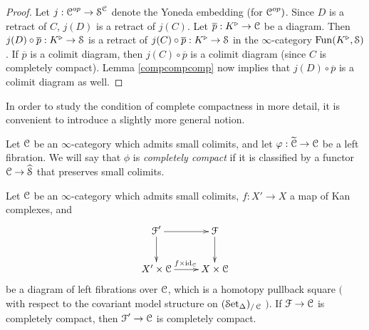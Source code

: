 \begin{proof}
Let $j: \operatorname{\mathcal{C}}^{op} \rightarrow \operatorname{\mathcal{S}}^{\operatorname{\mathcal{C}}}$ denote the Yoneda embedding (for $\operatorname{\mathcal{C}}^{op})$. Since $D$ is a retract of $C$, $j(D)$ is a retract of $j(C)$. Let $\overline{p}: K^{\triangleright} \rightarrow \operatorname{\mathcal{C}}$ be a diagram. Then $j(D) \circ \overline{p}: K^{\triangleright} \rightarrow \operatorname{\mathcal{S}}$
is a retract of $j(C) \circ \overline{p}: K^{\triangleright} \rightarrow \operatorname{\mathcal{S}}$ in the $\infty$-category
$\operatorname{Fun}(K^{\triangleright}, \operatorname{\mathcal{S}})$. If $\overline{p}$ is a colimit diagram, then $j(C) \circ \overline{p}$ is a colimit diagram (since $C$ is completely compact). Lemma \ref{compcompcomp} now implies
that $j(D) \circ \overline{p}$ is a colimit diagram as well.
\end{proof}

In order to study the condition of complete compactness in more detail, it is convenient to introduce a slightly more general notion.

\begin{definition}
Let $\operatorname{\mathcal{C}}$ be an $\infty$-category which admits small colimits, and let
$\varphi: \widetilde{\operatorname{\mathcal{C}}} \rightarrow \operatorname{\mathcal{C}}$ be a left fibration. We will say that $\phi$ is
{\it completely compact} if it is classified by a functor $\operatorname{\mathcal{C}} \rightarrow \widehat{\operatorname{\mathcal{S}}}$ that preserves small colimits.
\end{definition}

\begin{lemma}\label{bstick}
Let $\operatorname{\mathcal{C}}$ be an $\infty$-category which admits small colimits, $f: X' \rightarrow X$
a map of Kan complexes, and
$$ \xymatrix{ \calF' \ar[r] \ar[d] & \calF \ar[d] \\
X' \times \calC \ar[r]^{f \times \id_{\calC}} & X \times \calC }$$
be a diagram of left fibrations over $\operatorname{\mathcal{C}}$, which is a homotopy pullback square
$($ with respect to the covariant model structure on $(\operatorname{\mathcal{S}et_{\Delta}})_{/\operatorname{\mathcal{C}}}$ $)$. 
If $\operatorname{\mathcal{F}} \rightarrow \operatorname{\mathcal{C}}$ is completely compact, then $\operatorname{\mathcal{F}}' \rightarrow \operatorname{\mathcal{C}}$ is completely compact.
\end{lemma}

